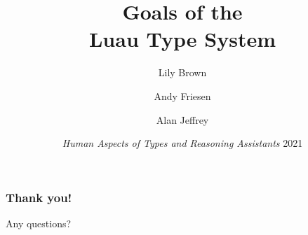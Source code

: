 \documentclass[aspectratio=169]{beamer}
\title{Goals of the\\Luau Type System}
\author{Lily Brown \and Andy Friesen \and Alan Jeffrey}
\institute[Roblox]{\texttt{[image: Logo-Roblox-Black-Full.png]}}
\date[HATRA '21]{\textit{Human Aspects of Types and Reasoning Assistants} 2021}
\begin{document}
{
\frame{\titlepage}}

\begin{frame}
\frametitle{Thank you!}
Any questions?

\end{frame}
\end{document}
